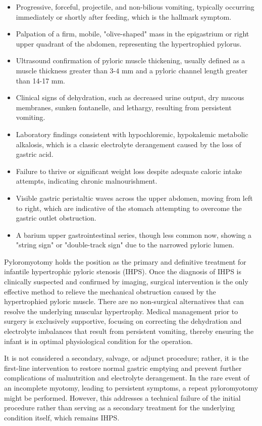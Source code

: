 \begin{itemize}
  \item Progressive, forceful, projectile, and non-bilious vomiting, typically occurring immediately or shortly after feeding, which is the hallmark symptom.
  \item Palpation of a firm, mobile, "olive-shaped" mass in the epigastrium or right upper quadrant of the abdomen, representing the hypertrophied pylorus.
  \item Ultrasound confirmation of pyloric muscle thickening, usually defined as a muscle thickness greater than 3-4 mm and a pyloric channel length greater than 14-17 mm.
  \item Clinical signs of dehydration, such as decreased urine output, dry mucous membranes, sunken fontanelle, and lethargy, resulting from persistent vomiting.
  \item Laboratory findings consistent with hypochloremic, hypokalemic metabolic alkalosis, which is a classic electrolyte derangement caused by the loss of gastric acid.
  \item Failure to thrive or significant weight loss despite adequate caloric intake attempts, indicating chronic malnourishment.
  \item Visible gastric peristaltic waves across the upper abdomen, moving from left to right, which are indicative of the stomach attempting to overcome the gastric outlet obstruction.
  \item A barium upper gastrointestinal series, though less common now, showing a "string sign" or "double-track sign" due to the narrowed pyloric lumen.
\end{itemize}

Pyloromyotomy holds the position as the primary and definitive treatment for infantile hypertrophic pyloric stenosis (IHPS). Once the diagnosis of IHPS is clinically suspected and confirmed by imaging, surgical intervention is the only effective method to relieve the mechanical obstruction caused by the hypertrophied pyloric muscle. There are no non-surgical alternatives that can resolve the underlying muscular hypertrophy. Medical management prior to surgery is exclusively supportive, focusing on correcting the dehydration and electrolyte imbalances that result from persistent vomiting, thereby ensuring the infant is in optimal physiological condition for the operation.

It is not considered a secondary, salvage, or adjunct procedure; rather, it is the first-line intervention to restore normal gastric emptying and prevent further complications of malnutrition and electrolyte derangement. In the rare event of an incomplete myotomy, leading to persistent symptoms, a repeat pyloromyotomy might be performed. However, this addresses a technical failure of the initial procedure rather than serving as a secondary treatment for the underlying condition itself, which remains IHPS.

